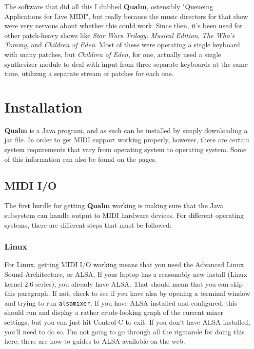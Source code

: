 \documentclass{article}
\newcommand{\q}{{\sf\bf{Qualm}}\xspace}
\newcommand{\code}[1]{{\tt #1}}
\begin{document}
The software that did all this I dubbed \q, ostensibly "Queueing
Applications for Live MIDI", but really because the music directors
for that show were very nervous about whether this could work.  Since
then, it's been used for other patch-heavy shows like {\em Star Wars
  Trilogy: Musical Edition}, {\em The Who's Tommy}, and {\em Children
  of Eden}.  Most of these were operating a single keyboard with many
patches, but {\em Children of Eden}, for one, actually used a single
synthesizer module to deal with input from three separate keyboards at
the same time, utilizing a separate stream of patches for each one.

\section{Installation}

\q is a Java program, and as such can be installed by simply
downloading a jar file.  In order to get MIDI support working
properly, however, there are certain system requirements that vary
from operating system to operating system.  Some of this information
can also be found on the  pages.

\subsection{MIDI I/O}

The first hurdle for getting \q working is making sure that the Java
subsystem can handle output to MIDI hardware devices.  For different
operating systems, there are different steps that must be followed:

\subsubsection{Linux}

For Linux, getting MIDI I/O working means that you need the Advanced
Linux Sound Architecture, or ALSA.  If your laptop has a reasonably
new install (Linux kernel 2.6 series), you already have ALSA.  That
should mean that you can skip this paragraph.  If not, check to see if
you have alsa by opening a terminal window and trying to run
\code{alsamixer}.  If you have ALSA installed and configured, this
should run and display a rather crude-looking graph of the current
mixer settings, but you can just hit Control-C to exit.  If you don't
have ALSA installed, you'll need to do so.  I'm not going to go
through all the rigmarole for doing this here; there are how-to guides
to ALSA available on the web.
\end{document}
